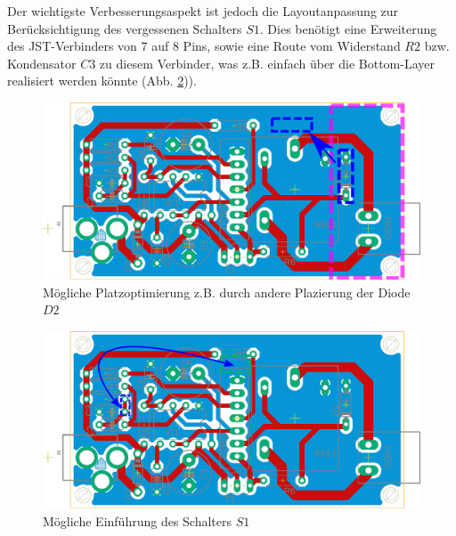 \documentclass[a4paper, 12pt]{article}
\begin{document}
    Der wichtigste Verbesserungsaspekt ist jedoch die Layoutanpassung zur Berücksichtigung des vergessenen Schalters $S1$. Dies benötigt eine Erweiterung des JST-Verbinders von 7 auf 8 Pins, sowie eine Route vom Widerstand $R2$ bzw. Kondensator $C3$ zu diesem Verbinder, was z.B. einfach über die Bottom-Layer realisiert werden könnte (Abb. \ref{fig:schalterkorrektur})).\\

    \begin{figure}[h]
    \begin{center}
      \includegraphics[page=1, scale=0.5]{graphics/sparen.pdf}
      \caption{Mögliche Platzoptimierung z.B. durch andere Plazierung der Diode $D2$}
      \label{fig:sparen}
    \end{center}
    \end{figure}

    \begin{figure}[h]
    \begin{center}
      \includegraphics[page=1, scale=0.5]{graphics/schalterkorrektur.pdf}
      \caption{Mögliche Einführung des Schalters $S1$ }
      \label{fig:schalterkorrektur}
    \end{center}
    \end{figure}
\end{document}
